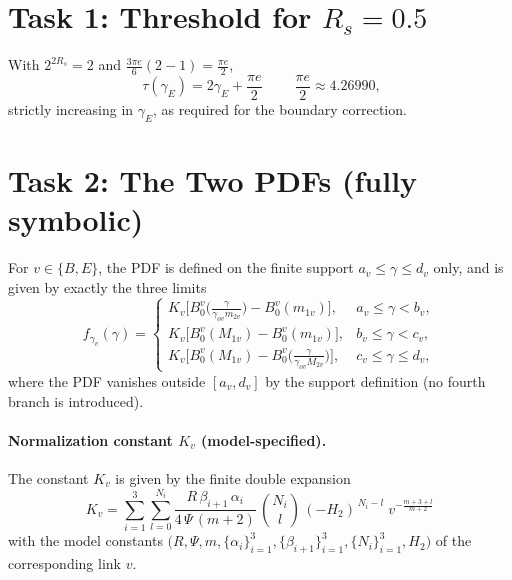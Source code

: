 \documentclass[11pt]{article}
\begin{document}
\section{Task 1: Threshold for $R_s=0.5$}
With $2^{2R_s}=2$ and $\tfrac{3\pi e}{6}(2-1)=\tfrac{\pi e}{2}$,
\begin{equation}
\boxed{\;\tau(\gamma_E)=2\gamma_E+\frac{\pi e}{2}\;}\qquad
\frac{\pi e}{2}\approx 4.26990,
\end{equation}
strictly increasing in $\gamma_E$, as required for the boundary correction.

\section{Task 2: The Two PDFs (fully symbolic)}
For $v\in\{B,E\}$, the PDF is defined on the finite support $a_v\le\gamma\le d_v$ only, and is given by exactly the three limits
\begin{equation}
f_{\gamma_v}(\gamma)=
\begin{cases}
K_v\big[B_0^{v}\!\big(\tfrac{\gamma}{\gamma_{ov}m_{2v}}\big)-B_0^{v}(m_{1v})\big], & a_v\le\gamma<b_v,\\[1.5mm]
K_v\big[B_0^{v}(M_{1v})-B_0^{v}(m_{1v})\big], & b_v\le\gamma<c_v,\\[1.5mm]
K_v\big[B_0^{v}(M_{1v})-B_0^{v}\!\big(\tfrac{\gamma}{\gamma_{ov}M_{2v}}\big)\big], & c_v\le\gamma\le d_v,
\end{cases}
\end{equation}
where the PDF vanishes outside $[a_v,d_v]$ by the support definition (no fourth branch is introduced).

\paragraph{Normalization constant $K_v$ (model-specified).} The constant $K_v$ is given by the finite double expansion
\begin{equation}
\boxed{\;K_v=\sum_{i=1}^{3}\sum_{l=0}^{N_i}
\frac{R\,\beta_{i+1}\,\alpha_i}{4\,\Psi\,(m+2)}\,
\binom{N_i}{l}\,(-H_2)^{\,N_i-l}\;
v^{-\frac{m+3+l}{m+2}}\;}
\label{eq:Kv}
\end{equation}
with the model constants $\big(R,\Psi,m,\{\alpha_i\}_{i=1}^{3},\{\beta_{i+1}\}_{i=1}^{3},\{N_i\}_{i=1}^{3},H_2\big)$ of the corresponding link $v$.
\end{document}

